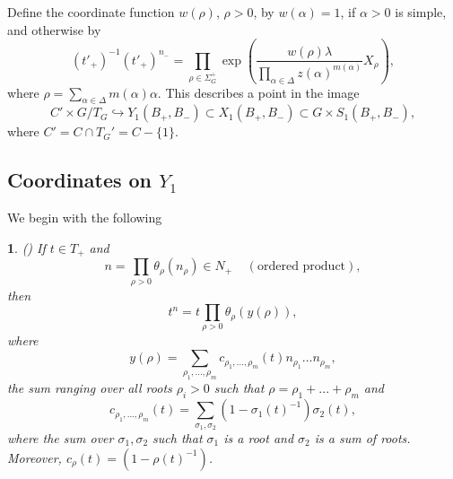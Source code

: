 \documentclass[12pt,letterpaper]{amsart}
\newcommand{\proclaimname}{}
\newtheorem*{proclaimx}{\proclaimname}
\newenvironment{proclaim}[1]%
  {\renewcommand{\proclaimname}{#1}\begin{proclaimx}}{\end{proclaimx}}
\begin{document}
Define the coordinate function $w(\rho)$, $\rho >0$, by
$w(\alpha)=1$, if $\alpha >0$ is simple, and otherwise by
\[
(t'_+)^{-1}(t'_+)^{n_-}=
\prod_{\rho\in\Sigma_G^+}
\exp (\frac{w(\rho)\lambda}{\prod_{\alpha\in\Delta}z(\alpha)^{m(\alpha)}}X_\rho),
\tag{1.20}
\]
where $\rho=\sum_{\alpha\in\Delta}m(\alpha)\alpha$. This describes a point
in the image
\[
C'\times G/T_G\hookrightarrow Y_1(B_+,B_-)
\subset X_1(B_+,B_-)\subset G\times S_1(B_+,B_-),
\]
where $C'=C\cap T_G'=C-\{1\}$.

\subsection*{Coordinates on $Y_1$}

We begin with the following

\begin{proclaim}{Lemma 1.21}(\cite[ch II, Lemma 3.3]{Ha92a}) If $t\in T_+$ and
\[
n=\prod_{\rho >0}\theta_\rho(n_\rho)\in N_+
\ \ \ \ \ (\text{ordered product}),
\]
then
\[
t^n=t\prod_{\rho >0}\theta_\rho(y(\rho)),
\]
where
\[
y(\rho)=\sum_{\rho_1,...,\rho_m} c_{\rho_1,...,\rho_m}(t)
n_{\rho_1}...n_{\rho_m},
\]
the sum ranging over all roots $\rho_i>0$ such that
$\rho=\rho_1+...+\rho_m$ and
\[
c_{\rho_1,...,\rho_m}(t)=
\sum_{\sigma_1,\sigma_2}(1-\sigma_1(t)^{-1})\sigma_2(t),
\]
where the sum over $\sigma_1,\sigma_2$ such that $\sigma_1$ is a root
and $\sigma_2$ is a sum of roots. Moreover, $c_\rho(t)=(1-\rho(t)^{-1})$.
\end{proclaim}
\end{document}

